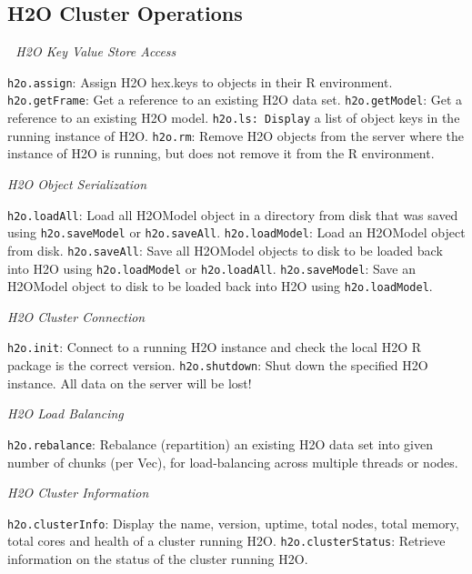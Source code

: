 \documentclass[11pt]{article}
\begin{document}
{\subsection{H2O Cluster Operations} 
\emph{H2O Key Value Store Access}\par
{\texttt{h2o.assign}}: Assign H2O hex.keys to objects in their R environment.\newline
{\texttt{h2o.getFrame}}: Get a reference to an existing H2O data set. \newline
{\texttt{h2o.getModel}}: Get a reference to an existing H2O model. \newline
{\texttt{h2o.ls: Display}} a list of object keys in the running instance of H2O. \newline
{\texttt{h2o.rm}}: Remove H2O objects from the server where the instance of H2O is running, but does not remove it from the R environment.\newline

\emph{H2O Object Serialization}\par
{\texttt{h2o.loadAll}}: Load all H2OModel object in a directory from disk that was saved using {\texttt{h2o.saveModel}} or {\texttt{h2o.saveAll}}.\newline
{\texttt{h2o.loadModel}}: Load an H2OModel object from disk.\newline
{\texttt{h2o.saveAll}}: Save all H2OModel objects to disk to be loaded back into H2O using {\texttt{h2o.loadModel}} or {\texttt{h2o.loadAll}}.\newline
{\texttt{h2o.saveModel}}: Save an H2OModel object to disk to be loaded back into H2O using {\texttt{h2o.loadModel}}.\newline

\emph{H2O Cluster Connection}\par
{\texttt{h2o.init}}: Connect to a running H2O instance and check the local H2O R package is the correct version.\newline
{\texttt{h2o.shutdown}}: Shut down the specified H2O instance. All data on the server will be lost!\newline

\emph{H2O Load Balancing}\par
{\texttt{h2o.rebalance}}: Rebalance (repartition) an existing H2O data set into given number of chunks (per Vec), for load-balancing across multiple threads or nodes.\newline

\emph{H2O Cluster Information}\par
{\texttt{h2o.clusterInfo}}: Display the name, version, uptime, total nodes, total memory, total cores and health of a cluster running H2O.\newline
{\texttt{h2o.clusterStatus}}: Retrieve information on the status of the cluster running H2O.\newline

}
\end{document}

